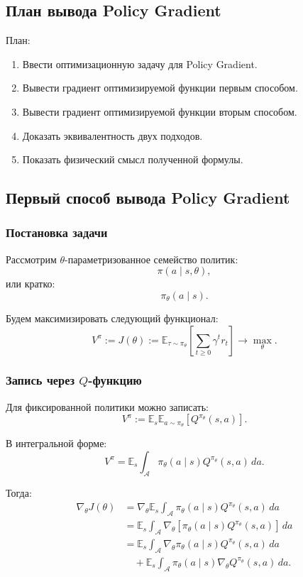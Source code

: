 \documentclass[12pt,a4paper]{article}
\begin{document}
\subsection{План вывода Policy Gradient}

План:

\begin{enumerate}
    \item Ввести оптимизационную задачу для Policy Gradient.
    \item Вывести градиент оптимизируемой функции первым способом.
    \item Вывести градиент оптимизируемой функции вторым способом.
    \item Доказать эквивалентность двух подходов.
    \item Показать физический смысл полученной формулы.
\end{enumerate}

\subsection{Первый способ вывода Policy Gradient}

\subsubsection{Постановка задачи}

Рассмотрим $\theta$-параметризованное семейство политик:
\[
\pi(a\mid s,\theta),
\]
или кратко:
\[
\pi_\theta(a\mid s).
\]

Будем максимизировать следующий функционал:
\[
V^\pi
:=
J(\theta)
:=
\mathbb E_{\tau\sim \pi_\theta}
\left[
\sum_{t\ge 0}
\gamma^t r_t
\right]
\to
\max_\theta.
\]

\subsubsection{Запись через $Q$-функцию}

Для фиксированной политики можно записать:
\[
V^\pi
:=
\mathbb E_s
\mathbb E_{a\sim \pi_\theta}
\left[
Q^{\pi_\theta}(s,a)
\right].
\]

В интегральной форме:
\[
V^\pi
=
\mathbb E_s
\int_{\mathcal A}
\pi_\theta(a\mid s)
Q^{\pi_\theta}(s,a)
\,da.
\]

Тогда:
\[
\begin{aligned}
\nabla_\theta J(\theta)
&=
\nabla_\theta
\mathbb E_s
\int_{\mathcal A}
\pi_\theta(a\mid s)
Q^{\pi_\theta}(s,a)
\,da
\\
&=
\mathbb E_s
\int_{\mathcal A}
\nabla_\theta
\left[
\pi_\theta(a\mid s)
Q^{\pi_\theta}(s,a)
\right]
\,da
\\
&=
\mathbb E_s
\int_{\mathcal A}
\nabla_\theta \pi_\theta(a\mid s)
Q^{\pi_\theta}(s,a)
\,da
\\
&\quad+
\mathbb E_s
\int_{\mathcal A}
\pi_\theta(a\mid s)
\nabla_\theta Q^{\pi_\theta}(s,a)
\,da.
\end{aligned}
\]
\end{document}
